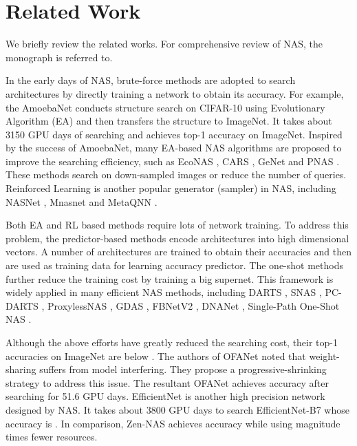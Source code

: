 \documentclass{article}
\providecommand{\citep}{\cite}
\begin{document}
\section{Related Work}
\label{sec:related-work}


We briefly review the related works. For comprehensive review of NAS, the monograph \citep{ren_comprehensive_2020} is referred to. 

In the early days of NAS, brute-force methods are adopted to search architectures by directly training a network to obtain its accuracy. For example, the AmoebaNet \citep{realRegularizedEvolutionImage2019} conducts structure search on CIFAR-10 using Evolutionary Algorithm (EA) \citep{krizhevskyLearningMultipleLayers2009} and then transfers the structure to ImageNet. It takes about 3150 GPU days of searching and achieves  top-1 accuracy on ImageNet. Inspired by the success of AmoebaNet, many EA-based NAS algorithms are proposed to improve the searching efficiency, such as EcoNAS \citep{zhouEcoNASFindingProxies2020}, CARS \citep{yangCARSContinuousEvolution2020}, GeNet \citep{xieGeneticCNN2017} and  PNAS \citep{liuProgressiveNeuralArchitecture2018}. These methods search on down-sampled images or reduce the number of queries. Reinforced Learning is another popular generator (sampler) in NAS, including NASNet \citep{zophLearningTransferableArchitectures2018}, Mnasnet \citep{tan_mnasnet:_2019} and MetaQNN \citep{bakerDesigningNeuralNetwork2017}. 



Both EA and RL based methods require lots of network training. To address this problem, the predictor-based methods encode architectures into high dimensional vectors. A number of architectures are trained to obtain their accuracies \citep{luoNeuralArchitectureOptimization2018,luoSemiSupervisedNeuralArchitecture2020} and then are used as training data for learning accuracy predictor. The one-shot methods further reduce the training cost by training a big supernet. This framework is widely applied in many efficient NAS methods, including DARTS \citep{liuDARTSDifferentiableArchitecture2019}, SNAS \citep{xieSNASStochasticNeural2018}, PC-DARTS \citep{xuPCDARTSPartialChannel2019}, ProxylessNAS \citep{cai_proxylessnas:_2019}, GDAS \citep{zhangOvercomingMultiModelForgetting2020}, FBNetV2 \citep{wanFBNetV2DifferentiableNeural2020},  DNANet \citep{liBlockwiselySupervisedNeural2020}, Single-Path One-Shot NAS \citep{guoSinglePathOneShot2020}.


Although the above efforts have greatly reduced the searching cost, their top-1 accuracies on ImageNet are below . The authors of OFANet \citep{caiOnceforAllTrainOne2020} noted that weight-sharing suffers from model interfering. They propose a progressive-shrinking strategy to address this issue. The resultant OFANet achieves  accuracy after searching for 51.6 GPU days. EfficientNet \citep{tanEfficientNetRethinkingModel2019} is another high precision network designed by NAS. It takes about 3800 GPU days to search EfficientNet-B7 whose accuracy is . In comparison, Zen-NAS achieves  accuracy while using magnitude times fewer resources.
\end{document}
